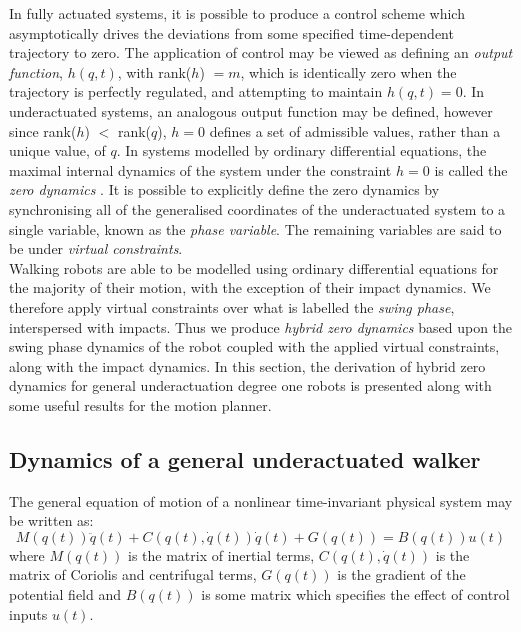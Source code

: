 In fully actuated systems, it is possible to produce a control scheme which asymptotically drives the deviations from some specified time-dependent trajectory to zero. The application of control may be viewed as defining an \textit{output function}, $h(q,t)$, with rank($h$) $= m$, which is identically zero when the trajectory is perfectly regulated, and attempting to maintain $h(q,t) = 0$. In underactuated systems, an analogous output function may be defined, however since rank($h$) $<$ rank($q$), $h = 0$ defines a set of admissible values, rather than a unique value, of $q$. In systems modelled by ordinary differential equations, the maximal internal dynamics of the system under the constraint $h=0$ is called the \textit{zero dynamics} \cite{isidori1995nonlinear}. It is possible to explicitly define the zero dynamics by synchronising all of the generalised coordinates of the underactuated system to a single variable, known as the \textit{phase variable}. The remaining variables are said to be under \textit{virtual constraints}.\\

Walking robots are able to be modelled using ordinary differential equations for the majority of their motion, with the exception of their impact dynamics. We therefore apply virtual constraints over what is labelled the \textit{swing phase}, interspersed with impacts. Thus we produce \textit{hybrid zero dynamics} based upon the swing phase dynamics of the robot coupled with the applied virtual constraints, along with the impact dynamics. In this section, the derivation of hybrid zero dynamics for general underactuation degree one robots is presented along with some useful results for the motion planner.

\subsection{Dynamics of a general underactuated walker}
The general equation of motion of a nonlinear time-invariant physical system may be written as:
\begin{equation}\label{eqn:dynamics}
	M\left(q(t)\right)\ddot{q}(t) + C\left(q(t),\dot{q}(t)\right)\dot{q}(t)
	 + G\left(q(t)\right) = B\left(q(t)\right)u(t)
\end{equation}
where $M\left(q(t)\right)$ is the matrix of inertial terms, $C\left(q(t),\dot{q}(t)\right)$ is the matrix of Coriolis and centrifugal terms, $G\left(q(t)\right)$ is the gradient of the potential field and $B\left(q(t)\right)$ is some matrix which specifies the effect of control inputs $u(t)$. \\

